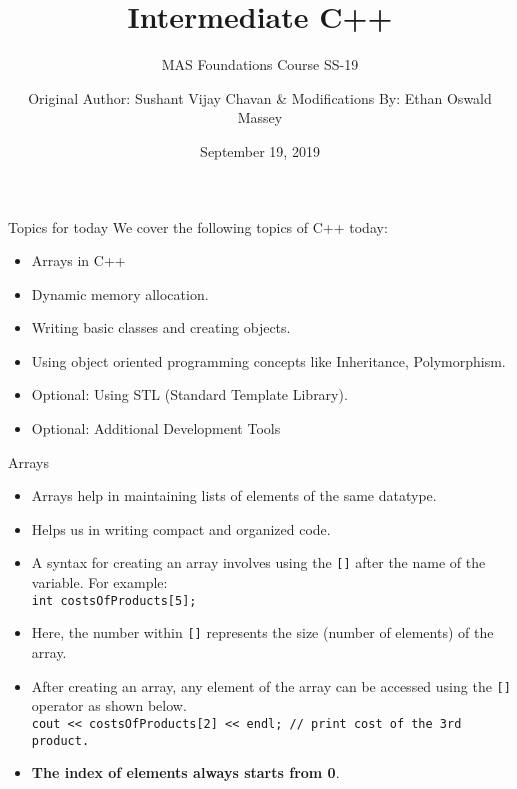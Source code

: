\documentclass[aspectratio=169]{beamer}
\author[Chavan]{Original Author: Sushant Vijay Chavan \& Modifications By: Ethan Oswald Massey}
\title{Intermediate C++}
\subtitle{MAS Foundations Course SS-19}
\institute[HBRS]{Hochschule Bonn-Rhein-Sieg}
\date{September 19, 2019}
\begin{document}
{
\begin{frame}
\titlepage
\end{frame}
}

\begin{frame}{Topics for today}
    We cover the following topics of C++ today:
        \begin{itemize}
            \item Arrays in C++
            \item Dynamic memory allocation.
            \item Writing basic classes and creating objects.
            \item Using object oriented programming concepts like Inheritance, Polymorphism.
            \item Optional: Using STL (Standard Template Library).
            \item Optional: Additional Development Tools
        \end{itemize}
\end{frame}

\begin{frame}[fragile]{Arrays}
    \begin{itemize}
        \item Arrays help in maintaining lists of elements of the same datatype.
        \item Helps us in writing compact and organized code.
        \item A syntax for creating an array involves using the \verb|[]| after the name of the variable. For example: \\ \verb|int costsOfProducts[5];|
        \item Here, the number within \verb|[]| represents the size (number of elements) of the array.
        \item After creating an array, any element of the array can be accessed using the \verb|[]| operator as shown below. \\ \verb|cout << costsOfProducts[2] << endl; // print cost of the 3rd product.|
        \item  \textbf{The index of elements always starts from 0}.
    \end{itemize}
\end{frame}
\end{document}
